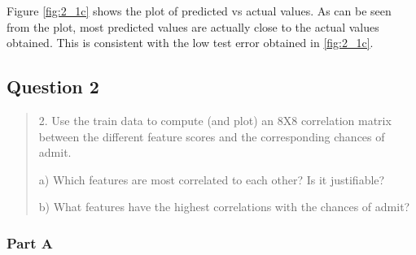 Figure \ref{fig:2_1c} shows the plot of predicted vs actual values. As can be seen from the plot, most predicted values are actually close to the actual values obtained. This is consistent with the low test error obtained in \ref{fig:2_1c}.

\subsection{Question 2}
\label{2q2}
\begin{quote}
2. Use the train data to compute (and plot) an 8X8 correlation matrix between the different feature scores and the corresponding chances of admit.

a) Which features are most correlated to each other? Is it justifiable?

b) What features have the highest correlations with the chances of admit?
\end{quote}
\subsubsection{Part A}

